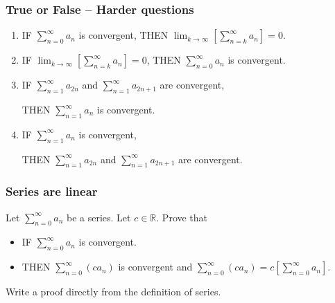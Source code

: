 \begin{frame}[t]
	\fontsize{12}{12}\selectfont
	\frametitle{True or False -- Harder questions}
	\vspace{-.2cm}
	\begin{enumerate}
		\item IF $\displaystyle \sum_{n=0}^{\infty}a_{n}$ is convergent, \quad THEN
			$\displaystyle \lim_{k \to \infty}\left[ \sum_{n=k}^{\infty}a_{n}\right] =
			0$.
			\vspace{.2cm}

		\item IF $\displaystyle \lim_{k \to \infty}\left[ \sum_{n=k}^{\infty}a_{n}\right
			] = 0$, \quad THEN $\displaystyle \sum_{n=0}^{\infty}a_{n}$ is convergent.
			\vspace{.2cm}

		\item IF $\displaystyle \sum_{n=1}^{\infty}a_{2n}$ and $\displaystyle \sum_{n=1}
			^{\infty}a_{2n+1}$ are convergent,

			THEN $\displaystyle \sum_{n=1}^{\infty}a_{n}$ is convergent.
			\vspace{.2cm}

		\item IF $\displaystyle \sum_{n=1}^{\infty}a_{n}$ is convergent,

			THEN $\displaystyle \sum_{n=1}^{\infty}a_{2n}$ and $\displaystyle \sum_{n=1}
			^{\infty}a_{2n+1}$ are convergent.
	\end{enumerate}
\end{frame}

\begin{frame}[t]
	\fontsize{13}{13}\selectfont
	\frametitle{Series are linear}

	Let $\displaystyle \sum_{n=0}^{\infty}a_{n}$ be a series. Let
	$c \in \mathbb{R}$. Prove that
	\begin{itemize}
		\item IF $\displaystyle \sum_{n=0}^{\infty}a_{n}$ is convergent.

		\item THEN $\displaystyle \sum_{n=0}^{\infty}( ca_{n})$ is convergent and $\displaystyle
			\sum_{n=0}^{\infty}( c a_{n}) = c \left[ \sum_{n=0}^{\infty}a_{n}\right].$
	\end{itemize}
	\vspace{.5cm}

	Write a proof directly from the definition of series.
\end{frame}

